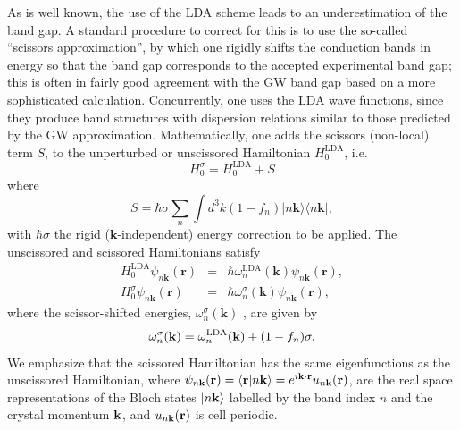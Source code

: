\documentclass[floatfix,prb,aps,superscriptaddress,11pt,preprint,letterpaper]{revtex4}
\begin{document}
As is well known, the use of the LDA scheme 
leads to an underestimation of the band gap. A standard
procedure to correct for this is to
use the so-called ``scissors approximation'', by which one rigidly shifts the
conduction bands in energy so that the band gap corresponds to the accepted
experimental band gap; this is often in fairly good agreement with the GW
band gap based on a more sophisticated calculation.\cite{hybertsenPRB86}
Concurrently, one uses the LDA wave functions, since they produce band
structures with dispersion relations similar to those predicted by the GW
approximation. Mathematically, one adds the scissors (non-local) term 
$S$, to the unperturbed or unscissored Hamiltonian $H^{\mathrm{LDA}}_{0}$, i.e. 
\begin{equation*}
H^\sigma_{0}=H^{\mathrm{LDA}}_{0}+S
\end{equation*}
where 
\begin{equation}
S=\hbar \sigma\sum_{n}\int d^{3}k(1-f_{n})
|n\mathbf{k}\rangle\langle n\mathbf{k}|,
\label{hats}
\end{equation}
with $\hbar \sigma$  the rigid ($\mathbf{k}$-independent) energy correction to be
applied. 
The unscissored and scissored Hamiltonians satisfy 
\begin{eqnarray*}
H^{\mathrm{LDA}}_{0}\psi _{n\mathbf{k}}(\mathbf{r}) &=&\hbar \omega^{\mathrm{LDA}}_{n}(\mathbf{k})\psi _{n\mathbf{k}}(\mathbf{r}),
\label{hamils} \\
H_{0}^\sigma\psi _{n\mathbf{k}}(\mathbf{r}) &=&\hbar \omega_{n}^\sigma
(\mathbf{k})\psi _{n\mathbf{k}}(\mathbf{r}),
\end{eqnarray*}
where the scissor-shifted energies, 
$\omega_{n}^\sigma(\mathbf{k})$ , are given by
\begin{equation}
\omega_{n}^\sigma(\mathbf{k})=\omega^{\mathrm{LDA}}_{n}(\mathbf{k})+(1-f_{n})\sigma.
\label{wese}
\end{equation}
We emphasize that the scissored
Hamiltonian has the same eigenfunctions as the unscissored
Hamiltonian,
where
$\psi_{n\mathbf{k}}(\mathbf{r})=\langle {\mathbf{r}} | {n\mathbf{k}} \rangle=e^{i\mathbf{k}\cdot\mathbf{r}}u_{n\mathbf{k}}(\mathbf{r})$,
are the real space representations of the Bloch states $| n\mathbf{k} \rangle$ labelled 
by the band index $n$ and the crystal momentum $\mathbf{k}$, and $u_{n\mathbf{k}}(\mathbf{r})$
is cell periodic. 
\end{document}
